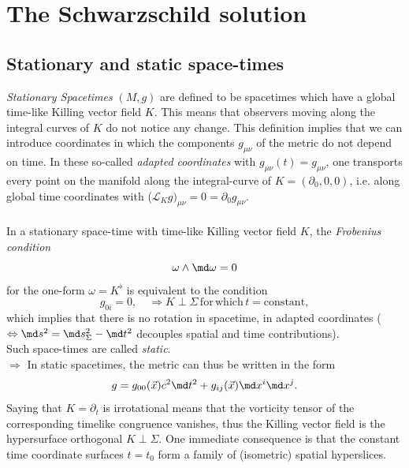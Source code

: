 \newpage
\section{The Schwarzschild solution}
\subsection{Stationary and static space-times}
\emph{Stationary Spacetimes} $(M,g)$ are defined to be spacetimes which have a global time-like Killing vector field $K$. This means that observers moving along the integral curves of $K$ do not notice any change. This definition implies that we can introduce coordinates in which the components $g_{\mu \nu}$ of the metric do not depend on time. In these so-called \emph{adapted coordinates} with $g_{\mu \nu}(t)=g_{\mu \nu}$, one transports every point on the manifold along the integral-curve of $K = (\partial_0,0,0)$, i.e. along global time coordinates with ($\mathcal{L}_K g)_{\mu \nu} = 0 = \partial_0 g_{\mu \nu}$.\\
\\
In a stationary space-time with time-like Killing vector field $K$, the \emph{Frobenius condition}
\begin{equation}
	\omega \wedge \md \omega =0
\end{equation}
for the one-form $\omega=K^{\flat}$ is equivalent to the condition
\begin{equation}
	g_{0i}=0, \quad  \Rightarrow K\perp \Sigma \,\mathrm{for\, which} \,t=\mathrm{constant},
\end{equation}
which implies that there is no rotation in spacetime, in adapted coordinates ($\Leftrightarrow \md s^2 = \md s^2_{\Sigma} - \md t^2$ decouples spatial and time contributions).\\
Such space-times are called \emph{static}.\\
$\Rightarrow$ In static spacetimes, the metric can thus be written in the form
\begin{equation}
	g = g_{00}(\vec{x}) c^2 \md t^2 + g_{ij}(\vec{x}) \md x^i \md x^j.
\end{equation}
Saying that $K=\partial_t$ is irrotational means that the vorticity tensor of the corresponding timelike congruence vanishes, thus the Killing vector field is the hypersurface orthogonal $K\perp\Sigma$. One immediate consequence is that the constant time coordinate surfaces $t=t_0$ form a family of (isometric) spatial hyperslices.
